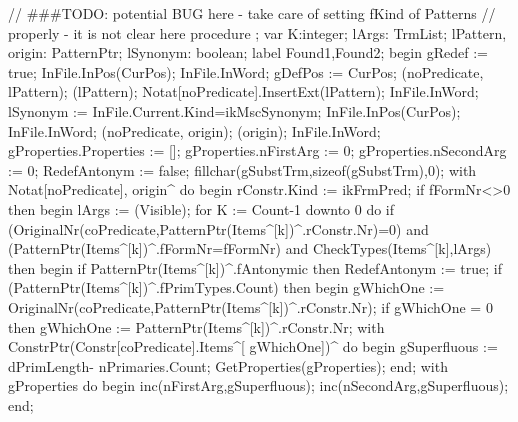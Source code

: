 \nwenddocs{}\endmoddef\nwstartdeflinemarkup{}\nwenddeflinemarkup
// ###TODO: potential BUG here - take care of setting fKind of Patterns
//          properly - it is not clear here
procedure ;
var
   K:integer;
   lArgs: TrmList;
   lPattern, origin: PatternPtr;
   lSynonym: boolean;
label Found1,Found2;
begin
   gRedef := true;
   InFile.InPos(CurPos); InFile.InWord;
   gDefPos := CurPos;
   (noPredicate, lPattern);
   (lPattern);
   Notat[noPredicate].InsertExt(lPattern);
   InFile.InWord;
   lSynonym := InFile.Current.Kind=ikMscSynonym;
   InFile.InPos(CurPos); InFile.InWord;
   (noPredicate, origin);
   (origin);
   InFile.InWord;
   gProperties.Properties := [];
   gProperties.nFirstArg := 0;
   gProperties.nSecondArg := 0;
   RedefAntonym := false;
   fillchar(gSubstTrm,sizeof(gSubstTrm),0);
   with Notat[noPredicate], origin^ do
   begin
      rConstr.Kind := ikFrmPred;
      if fFormNr<>0 then
      begin
         lArgs := (Visible);
         for K := Count-1 downto 0 do
            if (OriginalNr(coPredicate,PatternPtr(Items^[k])^.rConstr.Nr)=0) and
                  (PatternPtr(Items^[k])^.fFormNr=fFormNr) and
                  CheckTypes(Items^[k],lArgs)
            then
            begin
               if PatternPtr(Items^[k])^.fAntonymic then RedefAntonym := true;
               if (PatternPtr(Items^[k])^.fPrimTypes.Count) then
               begin
                  gWhichOne := OriginalNr(coPredicate,PatternPtr(Items^[k])^.rConstr.Nr);
                  if gWhichOne = 0 then
                     gWhichOne := PatternPtr(Items^[k])^.rConstr.Nr;
                  with ConstrPtr(Constr[coPredicate].Items^[ gWhichOne])^ do
                  begin
                     gSuperfluous := dPrimLength- nPrimaries.Count;
                     GetProperties(gProperties);
                  end;
                  with gProperties do
                  begin
                     inc(nFirstArg,gSuperfluous);
                     inc(nSecondArg,gSuperfluous);
                  end;
